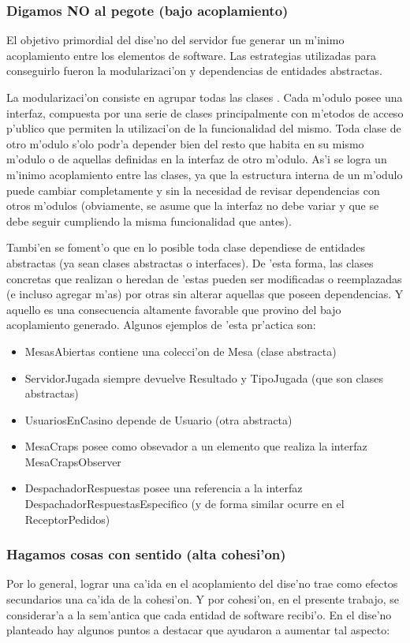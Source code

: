 \subsubsection{Digamos NO al pegote (bajo acoplamiento)}
El objetivo primordial del dise'no del servidor fue generar un m'inimo acoplamiento entre los elementos de software. Las estrategias utilizadas para conseguirlo fueron la modularizaci'on y dependencias de entidades abstractas.

La modularizaci'on consiste en agrupar todas las clases . Cada m'odulo posee una interfaz, compuesta por una serie de clases principalmente con m'etodos de acceso p'ublico que permiten la utilizaci'on de la funcionalidad del mismo. Toda clase de otro m'odulo s'olo podr'a depender bien del resto que habita en su mismo m'odulo o de aquellas definidas en la interfaz de otro m'odulo. As'i se logra un m'inimo acoplamiento entre las clases, ya que la estructura interna de un m'odulo puede cambiar completamente y sin la necesidad de revisar dependencias con otros m'odulos (obviamente, se asume que la interfaz no debe variar y que se debe seguir cumpliendo la misma funcionalidad que antes).

Tambi'en se foment'o que en lo posible toda clase dependiese de entidades abstractas (ya sean clases abstractas o interfaces). De 'esta forma, las clases concretas que realizan o heredan de 'estas pueden ser modificadas o reemplazadas (e incluso agregar m'as) por otras sin alterar aquellas que poseen dependencias. Y aquello es una consecuencia altamente favorable que provino del bajo acoplamiento generado. Algunos ejemplos de 'esta pr'actica son: 

\begin{itemize}
\item MesasAbiertas contiene una colecci'on de Mesa (clase abstracta)
\item ServidorJugada siempre devuelve Resultado y TipoJugada (que son clases abstractas)
\item UsuariosEnCasino depende de Usuario (otra abstracta)
\item MesaCraps posee como obsevador a un elemento que realiza la interfaz MesaCrapsObserver
\item DespachadorRespuestas posee una referencia a la interfaz DespachadorRespuestasEspecifico (y de forma similar ocurre en el ReceptorPedidos)
\end{itemize}



\subsubsection{Hagamos cosas con sentido (alta cohesi'on)}
Por lo general, lograr una ca'ida en el acoplamiento del dise'no trae como efectos secundarios una ca'ida de la cohesi'on. Y por cohesi'on, en el presente trabajo, se considerar'a a la sem'antica que cada entidad de software recibi'o. En el dise'no planteado hay algunos puntos a destacar que ayudaron a aumentar tal aspecto:

